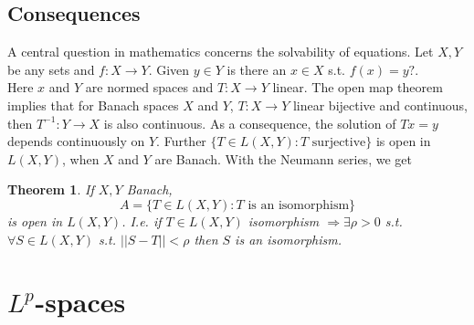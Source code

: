\documentclass[a4paper, 12pt]{article}
\theoremstyle{plain}
\newtheorem{theorem}{Theorem}[subsection] %
\theoremstyle{definition}
\theoremstyle{lemma}
\theoremstyle{remark}
\theoremstyle{corollary}
\theoremstyle{example}
\begin{document}
	\subsection{Consequences}
	A central question in mathematics concerns the solvability of equations. Let $X,Y$ be any sets and $f:X\to Y$. Given $y \in Y$ is there an $x \in X$ s.t. $f(x) = y?$.\\
	Here $x$ and $Y$ are normed spaces and $T:X\to Y$ linear. The open map theorem implies that for Banach spaces $X$ and $Y$, $T:X\to Y$ linear bijective and continuous, then $T^{-1}:Y \to X$ is also continuous. As a consequence, the solution of $Tx = y$ depends continuously on $Y$. Further $\{T \in L(X,Y): T \text{ surjective}\}$ is open in $L(X,Y)$, when $X$ and $Y$ are Banach. With the Neumann series, we get
	\begin{theorem}
		If $X,Y$ Banach, \[A = \{T \in L(X,Y): T \text{ is an isomorphism}\}\] is open in $L(X,Y)$. I.e. if $T\in L(X,Y)$ isomorphism $\Rightarrow \exists \rho > 0$ s.t. $\forall S \in L(X,Y)$ s.t. $||S-T|| < \rho$ then $S$ is an isomorphism. 
	\end{theorem}
	\section{$L^p$-spaces}
\end{document}
